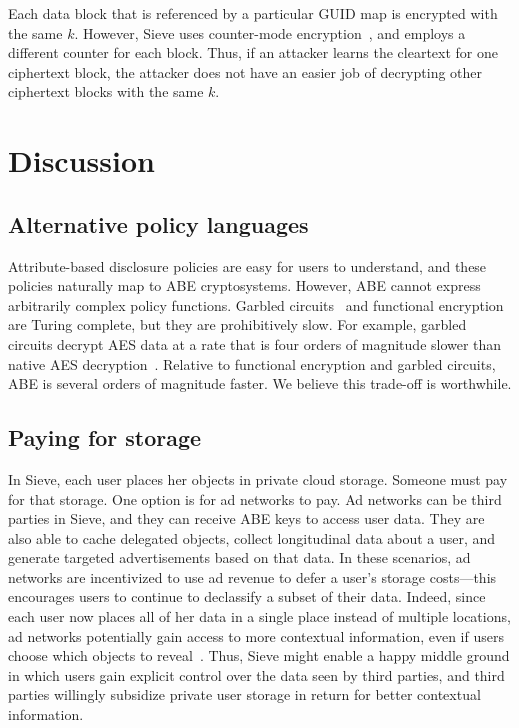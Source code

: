 Each data block that is referenced by
a particular GUID map is encrypted with the
same $k$. However, Sieve uses counter-mode
encryption~\cite{ctrmode}, and employs a
different counter for each block.
Thus, if an attacker learns the cleartext
for one ciphertext block, the attacker does
not have an easier job of decrypting other
ciphertext blocks with the same $k$.

\section{Discussion}
\label{sec:discussion}

\subsection{Alternative policy languages}
Attribute-based disclosure policies are easy
for users to understand, and these policies
naturally map to ABE cryptosystems. However,
ABE cannot express arbitrarily complex policy
functions. Garbled circuits~\cite{lindell2009proof}
and functional encryption~\cite{boneh2011functional}
are Turing complete, but they are prohibitively
slow. For example, garbled circuits decrypt
AES data at a rate that is four orders of
magnitude slower than native AES decryption~\cite{justGarble}.
Relative to functional encryption and garbled
circuits, ABE is several orders of magnitude
faster. We believe this trade-off is worthwhile.


\subsection{Paying for storage} In Sieve,
each user places her objects in private
cloud storage. Someone must pay for that
storage. One option is for ad networks to
pay. Ad networks can be third parties in
Sieve, and they can receive ABE keys to
access user data. They are also able
to cache delegated objects, collect
longitudinal data about a user, and generate
targeted advertisements based on that data.
In these scenarios, ad networks are
incentivized to use ad revenue to defer a
user's storage costs---this encourages users
to continue to declassify a subset of their
data. Indeed, since each user now places all
of her data in a single place instead of
multiple locations, ad networks potentially
gain access to more contextual information,
even if users choose which objects to
reveal~\cite{adnostic}. Thus, Sieve might
enable a happy middle ground in which users gain
explicit control over the data seen by third
parties, and third parties willingly subsidize
private user storage in return for better
contextual information.

